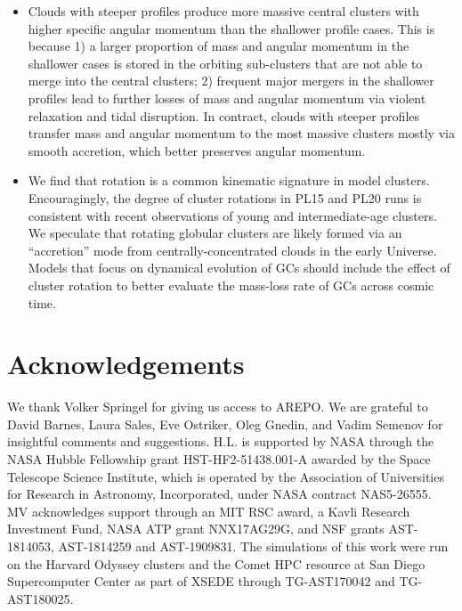 \documentclass[fleqn,usenatbib]{mnras}
\begin{document}
\begin{itemize}
    \item Clouds with steeper profiles produce more massive central clusters with higher specific angular momentum than the shallower profile cases. This is because 1) a larger proportion of mass and angular momentum in the shallower cases is stored in the orbiting sub-clusters that are not able to merge into the central clusters; 2) frequent major mergers in the shallower profiles lead to further losses of mass and angular momentum via violent relaxation and tidal disruption. In contract, clouds with steeper profiles transfer mass and angular momentum to the most massive clusters mostly via smooth accretion, which better preserves angular momentum.
    
    \item We find that rotation is a common kinematic signature in model clusters. Encouragingly, the degree of cluster rotations in PL15 and PL20 runs is consistent with recent observations of young and intermediate-age clusters. We speculate that rotating globular clusters are likely formed via an ``accretion'' mode from centrally-concentrated clouds in the early Universe. Models that focus on dynamical evolution of GCs should include the effect of cluster rotation to better evaluate the mass-loss rate of GCs across cosmic time.
\end{itemize}


\section*{Acknowledgements}
We thank Volker Springel for giving us access to AREPO. We are grateful to David Barnes, Laura Sales, Eve Ostriker, Oleg Gnedin, and Vadim Semenov for insightful comments and suggestions. H.L. is supported by NASA through the NASA Hubble Fellowship grant HST-HF2-51438.001-A awarded by the Space Telescope Science Institute, which is operated by the Association of Universities for Research in Astronomy, Incorporated, under NASA contract NAS5-26555. MV acknowledges support through an MIT RSC award, a Kavli Research Investment Fund, NASA ATP grant NNX17AG29G, and NSF grants AST-1814053, AST-1814259 and AST-1909831. The simulations of this work were run on the Harvard Odyssey clusters and the Comet HPC resource at San Diego Supercomputer Center as part of XSEDE through TG-AST170042 and TG-AST180025.


\end{document}
